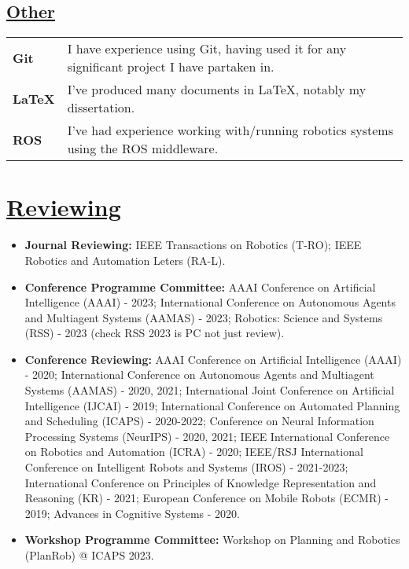 \documentclass[11pt]{article}
\begin{document}
		\subsection*{\underline{Other}}
		\renewcommand{\arraystretch}{1.3}%
		\begin{tabular}{ll}
			 \textbf{Git} & I have experience using Git, having used it for any significant project I have partaken in.\\
			\textbf{LaTeX} & I've produced many documents in LaTeX, notably my dissertation.\\
			\textbf{ROS} & I've had experience working with/running robotics systems using the ROS middleware.
		\end{tabular}
\fi

\section*{\underline{Reviewing}}
\begin{itemize}
\item \textbf{Journal Reviewing:} IEEE Transactions on Robotics (T-RO); IEEE Robotics and Automation Leters (RA-L).
\item \textbf{Conference Programme Committee:}  AAAI Conference on Artificial Intelligence (AAAI) - 2023; International Conference on Autonomous Agents and Multiagent Systems (AAMAS) - 2023;  Robotics: Science and Systems (RSS) - 2023 (check RSS 2023 is PC not just review).
\item \textbf{Conference Reviewing:} AAAI Conference on Artificial Intelligence (AAAI) - 2020; International Conference on Autonomous Agents and Multiagent Systems (AAMAS) - 2020, 2021; International Joint Conference on Artificial Intelligence (IJCAI) - 2019; International Conference on Automated Planning and Scheduling (ICAPS) - 2020-2022; Conference on Neural Information Processing Systems (NeurIPS) - 2020, 2021; IEEE International Conference on Robotics and Automation (ICRA) - 2020; IEEE/RSJ International Conference on Intelligent Robots and Systems (IROS) - 2021-2023; International Conference on Principles of Knowledge Representation and Reasoning (KR) - 2021; European Conference on Mobile Robots (ECMR) - 2019; Advances in Cognitive Systems - 2020.
\item\textbf{Workshop Programme Committee:} Workshop on Planning and Robotics (PlanRob) @ ICAPS 2023.
\end{itemize}
\end{document}
